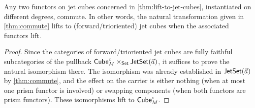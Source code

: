 \documentclass[a4paper]{article}
\begin{document}
%	
\begin{proposition} \label{thm:cube-commute}
	Any two functors on jet cubes concerned in \cref{thm:lift-to-jet-cubes}, instantiated on different degrees, commute.
	In other words, the natural transformation given in \cref{thm:commute} lifts to (forward/trioriented) jet cubes when the associated functors lift.
\end{proposition}
\begin{proof}
	Since the categories of forward/trioriented jet cubes are fully faithful subcategories of the pullback ${\mathsf{Cube}}_M^\varepsilon \times_{\mathsf{Set}} \mathsf{JetSet}(\vec a)$, it suffices to prove the natural isomorphism there.
	The isomorphism was already established in $\mathsf{JetSet}(\vec a)$ by \cref{thm:commute}, and the effect on the carrier is either nothing (when at most one prism functor is involved) or swapping components (when both functors are prism functors).
	These isomorphisms lift to ${\mathsf{Cube}}_M^\varepsilon$.
\end{proof}
\end{document}
